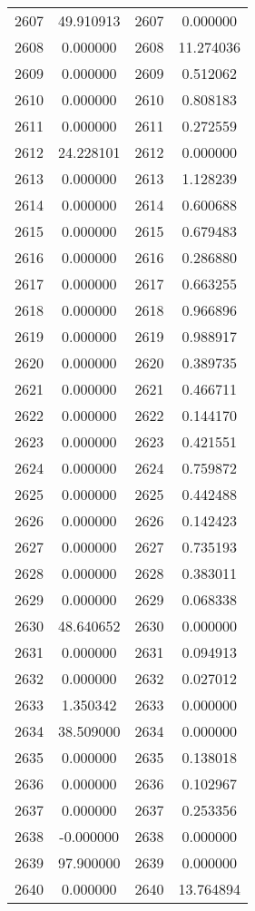 \documentclass[12pt]{article}
\begin{document}
\begin{longtable}{@{}cccc@{}}
2607 & 49.910913 & 2607 & 0.000000 \\
2608 & 0.000000 & 2608 & 11.274036 \\
2609 & 0.000000 & 2609 & 0.512062 \\
2610 & 0.000000 & 2610 & 0.808183 \\
2611 & 0.000000 & 2611 & 0.272559 \\
2612 & 24.228101 & 2612 & 0.000000 \\
2613 & 0.000000 & 2613 & 1.128239 \\
2614 & 0.000000 & 2614 & 0.600688 \\
2615 & 0.000000 & 2615 & 0.679483 \\
2616 & 0.000000 & 2616 & 0.286880 \\
2617 & 0.000000 & 2617 & 0.663255 \\
2618 & 0.000000 & 2618 & 0.966896 \\
2619 & 0.000000 & 2619 & 0.988917 \\
2620 & 0.000000 & 2620 & 0.389735 \\
2621 & 0.000000 & 2621 & 0.466711 \\
2622 & 0.000000 & 2622 & 0.144170 \\
2623 & 0.000000 & 2623 & 0.421551 \\
2624 & 0.000000 & 2624 & 0.759872 \\
2625 & 0.000000 & 2625 & 0.442488 \\
2626 & 0.000000 & 2626 & 0.142423 \\
2627 & 0.000000 & 2627 & 0.735193 \\
2628 & 0.000000 & 2628 & 0.383011 \\
2629 & 0.000000 & 2629 & 0.068338 \\
2630 & 48.640652 & 2630 & 0.000000 \\
2631 & 0.000000 & 2631 & 0.094913 \\
2632 & 0.000000 & 2632 & 0.027012 \\
2633 & 1.350342 & 2633 & 0.000000 \\
2634 & 38.509000 & 2634 & 0.000000 \\
2635 & 0.000000 & 2635 & 0.138018 \\
2636 & 0.000000 & 2636 & 0.102967 \\
2637 & 0.000000 & 2637 & 0.253356 \\
2638 & -0.000000 & 2638 & 0.000000 \\
2639 & 97.900000 & 2639 & 0.000000 \\
2640 & 0.000000 & 2640 & 13.764894 \\

\end{longtable}
\end{document}
